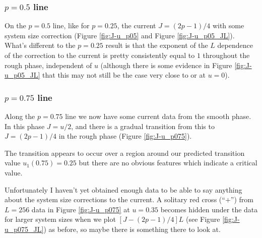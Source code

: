 \documentclass[a4paper,10pt]{article}
\newcommand{\fref}[1]{Figure \ref{#1}}
\begin{document}
\subsubsection{$p=0.5$ line}

On the $p=0.5$ line, like for $p=0.25$, the current $J = (2p-1)/4$ with some system size correction (\fref{fig:J-u_p05} and \fref{fig:J-u_p05_JL}). What's different to the $p=0.25$ result is that the exponent of the $L$ dependence of the correction to the current is pretty consistently equal to $1$ throughout the rough phase, independent of $u$ (although there is some evidence in \fref{fig:J-u_p05_JL} that this may not still be the case very close to or at $u=0$).

\subsubsection{$p=0.75$ line}

Along the $p=0.75$ line we now have some current data from the smooth phase. In this phase $J=u/2$, and there is a gradual transition from this to $J = (2p-1)/4$ in the rough phase (\fref{fig:J-u_p075}).

The transition appears to occur over a region around our predicted transition value $u_1(0.75) = 0.25$ but there are no obvious features which indicate a critical value.

Unfortunately I haven't yet obtained enough data to be able to say anything about the system size corrections to the current. A solitary red cross (``$+$'') from $L=256$ data in \fref{fig:J-u_p075} at $u=0.35$ becomes hidden under the data for larger system sizes when we plot $[J-(2p-1)/4]L$ (see \fref{fig:J-u_p075_JL}) as before, so maybe there is something there to look at.

\end{document}
